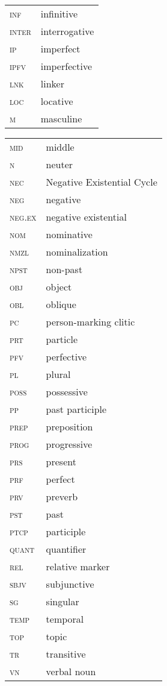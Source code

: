 \documentclass[output=paper]{langsci/langscibook}
\begin{document}
\begin{minipage}{\textwidth}
\begin{tabularx}{.5\textwidth}[t]{@{} l Q }
\textsc{inf}	&infinitive\\
\textsc{inter}		&interrogative\\
\textsc{ip}		&imperfect\\
\textsc{ipfv}		&imperfective\\
\textsc{lnk}		&linker\\
\textsc{loc}		&locative\\
\textsc{m} 		&masculine\\
\end{tabularx}
\begin{tabularx}{.5\textwidth}[t]{ l Q @{}}
\textsc{mid}		&middle\\
\textsc{n}		&neuter\\
\textsc{nec}		&Negative Existential Cycle\\
\textsc{neg}		&negative\\
\textsc{neg.ex}	&negative existential\\
\textsc{nom}		&nominative\\
\textsc{nmzl}		&nominalization\\
\textsc{npst}		&non-past\\
\textsc{obj}		&object\\
\textsc{obl}		&oblique\\
\textsc{pc}		&person-marking clitic\\
\textsc{prt}		&particle\\
\textsc{pfv}		&perfective\\
\textsc{pl}		&plural\\
\textsc{poss}		&possessive\\
\textsc{pp}		&past participle\\
\textsc{prep}		&preposition\\
\textsc{prog}		&progressive\\
\textsc{prs}		&present\\
\textsc{prf}		&perfect\\
\textsc{prv}		&preverb\\
\textsc{pst}		&past\\
\textsc{ptcp}		&participle\\
\textsc{quant}		&quantifier\\
\textsc{rel}		&relative marker\\
\textsc{sbjv}		&subjunctive\\
\textsc{sg}		&singular\\
\textsc{temp}		&temporal\\
\textsc{top}		&topic\\
\textsc{tr}		&transitive\\
\textsc{vn}		&verbal noun\\
\end{tabularx}
\end{minipage}
{\sloppy\printbibliography[heading=subbibliography,notkeyword=source]}
\end{document}
